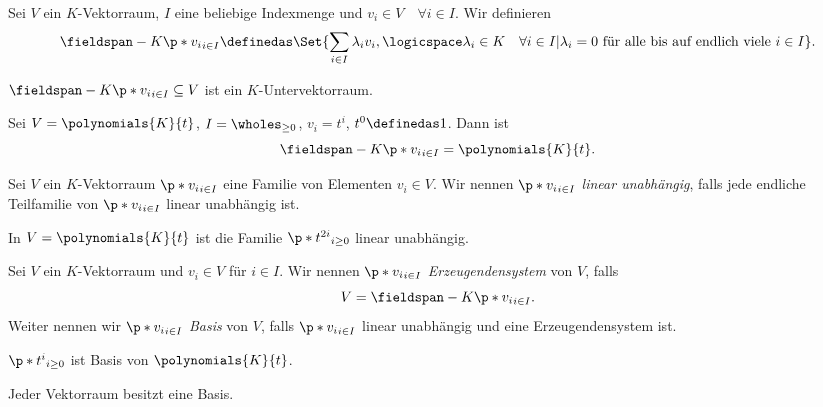 \begin{definition*}
  Sei \( V \) ein \( K \)-Vektorraum, \( I \) eine beliebige Indexmenge und \( v_i \in V\quad \forall i\in I\). Wir definieren 
  \begin{equation*}
    \fieldspan-{K}{\p*{v_i}_{i\in I}}\definedas \Set{\sum_{i\in I}\lambda_i v_i,\logicspace \lambda_i \in K\quad \forall i\in I|\lambda_i=0 \text{ für alle bis auf endlich viele } i\in I}.
  \end{equation*}
\end{definition*}
\begin{bemerkung*}
  \( \fieldspan-{K}{\p*{v_i}_{i\in I}}\subseteq V \) ist ein \( K \)-Untervektorraum.
\end{bemerkung*}
\begin{beispiel*}
  Sei \( V=\polynomials{K}{t} \), \( I=\wholes_{\geq 0} \), \( v_i=t^i \), \( t^0\definedas 1 \). Dann ist
  \begin{equation*}
    \fieldspan-{K}{\p*{v_i}_{i\in I}}=\polynomials{K}{t}.
  \end{equation*}
\end{beispiel*}
\begin{definition*}
  Sei \( V \) ein \( K \)-Vektorraum \( \p*{v_i}_{i\in I} \) eine Familie von Elementen \( v_i\in V \). Wir nennen \( \p*{v_i}_{i\in I} \) \emph{linear unabhängig}, falls jede endliche Teilfamilie von \( \p*{v_i}_{i\in I} \) linear unabhängig ist.
\end{definition*}
\begin{beispiel*}
  In \( V=\polynomials{K}{t} \) ist die Familie \( \p*{t^{2i}}_{i\geq 0} \) linear unabhängig.
\end{beispiel*}
\begin{definition*}
  Sei \( V \) ein \( K \)-Vektorraum und \( v_i\in V \) für \( i\in I \). Wir nennen \( \p*{v_i}_{i\in I} \) \emph{Erzeugendensystem} von \( V \), falls
  \begin{equation*}
    V=\fieldspan-{K}{\p*{v_i}_{i\in I}}.
  \end{equation*}
  Weiter nennen wir \( \p*{v_i}_{i\in I} \) \emph{Basis} von \( V \), falls \( \p*{v_i}_{i\in I} \) linear unabhängig und eine Erzeugendensystem ist.
\end{definition*}
\begin{beispiel*}
  \( \p*{t^i}_{i\geq 0} \) ist Basis von \( \polynomials{K}{t} \).
\end{beispiel*}
\begin{satz}
  Jeder Vektorraum besitzt eine Basis.
\end{satz}
